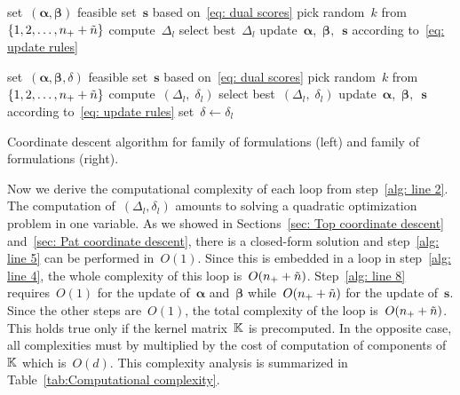 \begin{algorithm*}
  \begin{minipage}{0.50\textwidth}
    \centering
    \begin{algorithmic}[1]
      \State set~$(\bm{\alpha}, \bm{\beta})$ feasible
      \State set~$\bm{s}$ based on~\eqref{eq: dual scores} \label{alg: line 1}
      \Repeat \label{alg: line 2}
        \State pick random~$k$ from~$\{1, 2, \ldots, n_{+}+ \tilde{n} \}$ \label{alg: line 3}
         \label{alg: line 4}
            \State compute~$\Delta_{l}$  \label{alg: line 5}
        \EndFor
        \State select best~$\Delta_{l}$ \label{alg: line 7}
        \State update~$\bm{\alpha}$,~$\bm{\beta},$~$\bm{s}$ according to~\eqref{eq: update rules} \label{alg: line 8}
        \State \label{alg: line 9}
    \end{algorithmic}
  \end{minipage}
  \hfill
  \begin{minipage}{0.50\textwidth}
    \centering
    \begin{algorithmic}[1]
      \State set~$(\bm{\alpha}, \bm{\beta}, \delta)$ feasible
      \State set~$\bm{s}$ based on~\eqref{eq: dual scores}
      \Repeat
        \State pick random~$k$ from~$\{1, 2, \ldots, n_{+} + \tilde{n} \}$ 
            \State compute~$(\Delta_{l}, \; \delta_{l})$
        \EndFor
        \State select best~$(\Delta_{l}, \; \delta_{l})$
        \State update~$\bm{\alpha}$,~$\bm{\beta},$~$\bm{s}$ according to~\eqref{eq: update rules}
        \State set~$\delta \leftarrow \delta_{l}$
    \end{algorithmic}
  \end{minipage}
  \caption{Coordinate descent algorithm for \TopPushK family of formulations (left) and \PatMat  family of formulations (right).}
  \label{alg:Coordinate descent}
\end{algorithm*}

Now we derive the computational complexity of each \repeatloop loop from step~\ref{alg: line 2}. The computation of~$(\Delta_l,\delta_l)$ amounts to solving a quadratic optimization problem in one variable. As we showed in Sections~\ref{sec: Top coordinate descent} and~\ref{sec: Pat coordinate descent}, there is a closed-form solution and step~\ref{alg: line 5} can be performed in~$O(1)$. Since this is embedded in a \forloop loop in step~\ref{alg: line 4}, the whole complexity of this loop is~$O(n_{+} + \tilde{n})$. Step~\ref{alg: line 8} requires~$O(1)$ for the update of~$\bm{\alpha}$ and~$\bm{\beta}$ while~$O(n_{+} + \tilde{n})$ for the update of~$\bm{s}$. Since the other steps are~$O(1)$, the total complexity of the \repeatloop loop is~$O(n_{+} + \tilde{n})$. This holds true only if the kernel matrix~$\mathbb{K}$ is precomputed. In the opposite case, all complexities must by multiplied by the cost of computation of components of~$\mathbb{K}$ which is~$O(d)$. This complexity analysis is summarized in Table~\ref{tab:Computational complexity}. 

